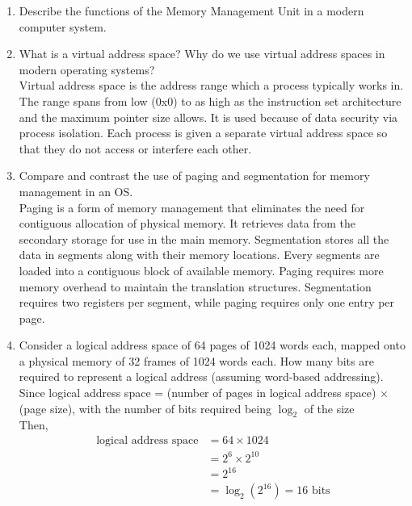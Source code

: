 \documentclass[paper=usletter, fontsize=12pt]{article}
\begin{document}
    \documentinfo{\today}

    \begin{enumerate}

        \item Describe the functions of the Memory Management Unit in a modern
        computer system.


        \item What is a virtual address space? Why do we use virtual address
        spaces in modern operating systems?\\
        Virtual address space is the address range which a process typically
        works in. The range spans from low (0x0) to as high as the instruction
        set architecture and the maximum pointer size allows. It is used
        because of data security via process isolation. Each process is given a
        separate virtual address space so that they do not access or interfere
        each other.

        \item Compare and contrast the use of paging and segmentation for
        memory management in an OS.\\
        Paging is a form of memory management that eliminates the need for
        contiguous allocation of physical memory. It retrieves data from the
        secondary storage for use in the main memory. Segmentation stores all
        the data in segments along with their memory locations. Every segments
        are loaded into a contiguous block of available memory. Paging requires
        more memory overhead to maintain the translation structures.
        Segmentation requires two registers per segment, while paging requires
        only one entry per page.

        \item Consider a logical address space of 64 pages of 1024 words each,
        mapped onto a physical memory of 32 frames of 1024 words each. How many
        bits are required to represent a logical address (assuming word-based
        addressing). \\
        Since logical address space = (number of pages in logical address
        space) $\times$ (page size), with the number of bits required being
        $\log_2$ of the size\\
        Then,
        \begin{align*}
            \text{logical address space} & = 64 \times 1024\\
            & = 2^{6} \times 2^{10}\\
            & = 2^{16}\\
            & = \log_2(2^{16}) = 16 \text{ bits}
        \end{align*}


\end{enumerate}
\end{document}
